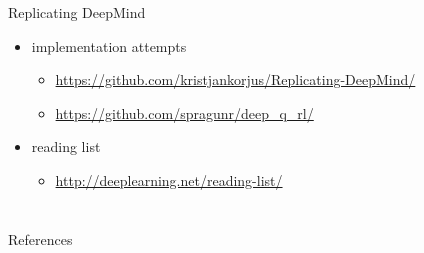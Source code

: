 \begin{frame}{Replicating DeepMind}
    \begin{itemize}\itemsep=12pt

        \item implementation attempts
        \vspace*{0.5em}
        \begin{itemize}        
            \item \url{https://github.com/kristjankorjus/Replicating-DeepMind/}
            \item \url{https://github.com/spragunr/deep\_q\_rl/}
        \end{itemize}

        \item reading list
        \vspace*{0.5em}
        \begin{itemize}
            \item \url{http://deeplearning.net/reading-list/}
        \end{itemize}

    \end{itemize}
\end{frame}

\section*{}

\begin{frame}[allowframebreaks]{References}
    
\end{frame}

